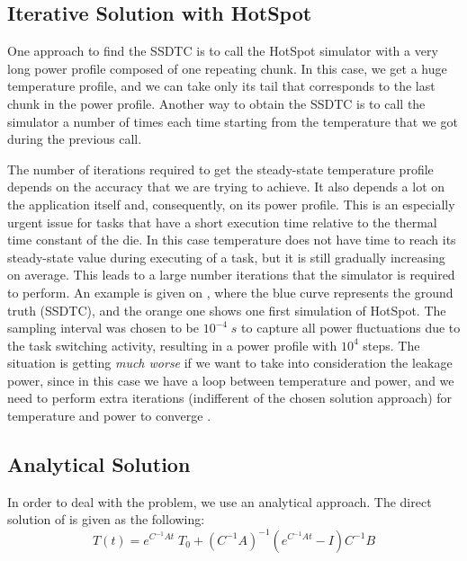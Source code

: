 \subsection{Iterative Solution with HotSpot}
One approach to find the SSDTC is to call the HotSpot simulator with a very long power profile composed of one repeating chunk. In this case, we get a huge temperature profile, and we can take only its tail that corresponds to the last chunk in the power profile. Another way to obtain the SSDTC is to call the simulator a number of times each time starting from the temperature that we got during the previous call.


The number of iterations required to get the steady-state temperature profile depends on the accuracy that we are trying to achieve. It also depends a lot on the application itself and, consequently, on its power profile. This is an especially urgent issue for tasks that have a short execution time relative to the thermal time constant of the die. In this case temperature does not have time to reach its steady-state value during executing of a task, but it is still gradually increasing on average. This leads to a large number iterations that the simulator is required to perform. An example is given on , where the blue curve represents the ground truth (SSDTC), and the orange one shows one first simulation of HotSpot. The sampling interval was chosen to be $10^{-4} \; s$ to capture all power fluctuations due to the task switching activity, resulting in a power profile with $10^4$ steps. The situation is getting \emph{much worse} if we want to take into consideration the leakage power, since in this case we have a loop between temperature and power, and we need to perform extra iterations (indifferent of the chosen solution approach) for temperature and power to converge \cite{liu2007}.

\subsection{Analytical Solution}
In order to deal with the problem, we use an analytical approach. The direct solution of  is given as the following:
\begin{equation} \label{eq:solution}
  T(t) = e^{C^{-1}A t} \; T_0 + (C^{-1} A)^{-1}(e^{C^{-1}A t} - I)C^{-1} B
\end{equation}

